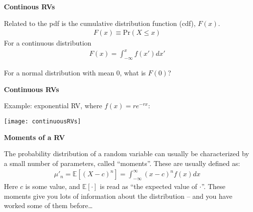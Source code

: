 \documentclass[12pt,xcolor=svgnames]{beamer}
\newcommand{\bl}{\color{blue}}
\newcommand{\theme}{\color{FireBrick}}
\newcommand{\ds}[1]{\mathds{#1}}
\newcommand{\sk}{\vspace{.4cm}}
\newcommand{\nsk}{\vspace{-.4cm}}
\newcommand{\chap}[1]{{\theme \Large \bf #1} \sk}
\newcommand{\E}{\ds{E}}
\newcommand{\pr}{\text{Pr}}
\begin{document}
\begin{frame}
\chap{Continous RVs}

Related to the pdf is the {\bl cumulative distribution function} (cdf), $F(x)$. 
\begin{align*}
F(x) \equiv \pr(X \leq x)
\end{align*}
For a continuous distribution
\nsk
\begin{align*}
F(x)= \int_{-\infty}^x f(x')dx'
\end{align*}

For a normal distribution with mean 0, what is $F(0)$? 

\end{frame}


\begin{frame}
\chap{Continuous RVs}

Example: exponential RV, where $f(x) = re^{-rx}$:

\begin{center}
\texttt{[image: continuousRVs]}
\end{center}

\end{frame}
%
%
%
%


\begin{frame}
\chap{Moments of a RV}

The probability distribution of a random variable can usually be characterized by a small number of parameters, called ``moments''. These are usually defined as:
\begin{align*}
\mu'_n = \E[(X-c)^n] = \int_{-\infty}^{\infty} (x-c)^n f(x) dx
\end{align*}
Here $c$ is some value, and $\E[\cdot]$ is read as ``the expected value of $\cdot$''.  These moments give you lots of information about the distribution -- and you have worked some of them before\dots
\end{frame}
\end{document}
